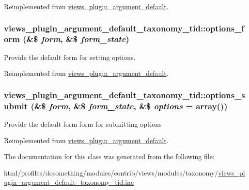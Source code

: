 Reimplemented from \hyperlink{classviews__plugin__argument__default_ac3a58218880857bc009d4617fab2241b}{views\_\-plugin\_\-argument\_\-default}.\hypertarget{classviews__plugin__argument__default__taxonomy__tid_a4039b38be3fb7c9702548abaae587b74}{
\subsubsection[{options\_\-form}]{\setlength{\rightskip}{0pt plus 5cm}views\_\-plugin\_\-argument\_\-default\_\-taxonomy\_\-tid::options\_\-form (\&\$ {\em form}, \/  \&\$ {\em form\_\-state})}}
\label{classviews__plugin__argument__default__taxonomy__tid_a4039b38be3fb7c9702548abaae587b74}
Provide the default form for setting options. 

Reimplemented from \hyperlink{classviews__plugin__argument__default_a9bc59dae448f4c35d422bc54d0879930}{views\_\-plugin\_\-argument\_\-default}.\hypertarget{classviews__plugin__argument__default__taxonomy__tid_a0bcf86a34e2d3a8600022b07c661ce05}{
\subsubsection[{options\_\-submit}]{\setlength{\rightskip}{0pt plus 5cm}views\_\-plugin\_\-argument\_\-default\_\-taxonomy\_\-tid::options\_\-submit (\&\$ {\em form}, \/  \&\$ {\em form\_\-state}, \/  \&\$ {\em options} = {\ttfamily array()})}}
\label{classviews__plugin__argument__default__taxonomy__tid_a0bcf86a34e2d3a8600022b07c661ce05}
Provide the default form form for submitting options 

Reimplemented from \hyperlink{classviews__plugin__argument__default_af4ea60d1be178072a6cf37feb582222c}{views\_\-plugin\_\-argument\_\-default}.

The documentation for this class was generated from the following file:\begin{DoxyCompactItemize}
\item 
html/profiles/dosomething/modules/contrib/views/modules/taxonomy/\hyperlink{views__plugin__argument__default__taxonomy__tid_8inc}{views\_\-plugin\_\-argument\_\-default\_\-taxonomy\_\-tid.inc}\end{DoxyCompactItemize}
